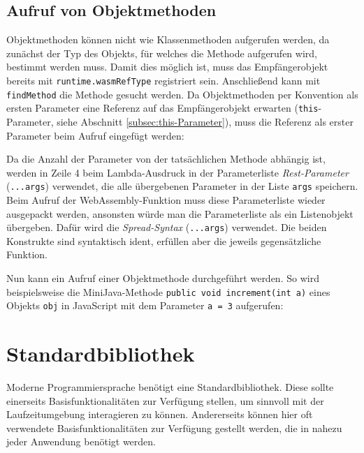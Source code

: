 \subsection{Aufruf von Objektmethoden}

Objektmethoden können nicht wie Klassenmethoden aufgerufen werden, da zunächst der Typ des Objekts, für welches die Methode aufgerufen wird, bestimmt werden muss. Damit dies möglich ist, muss das Empfängerobjekt bereits mit \lstinline{runtime.wasmRefType} registriert sein. Anschließend kann mit \lstinline{findMethod} die Methode gesucht werden. Da Objektmethoden per Konvention als ersten Parameter eine Referenz auf das Empfängerobjekt erwarten (\lstinline{this}-Parameter, siehe Abschnitt \ref{subsec:this-Parameter}), muss die Referenz als erster Parameter beim Aufruf eingefügt werden:



Da die Anzahl der Parameter von der tatsächlichen Methode abhängig ist, werden in Zeile 4 beim Lambda-Ausdruck in der Parameterliste \emph{Rest-Parameter} (\lstinline{...args}) \cite{MDNJavaScript} verwendet, die alle übergebenen Parameter in der Liste \lstinline{args} speichern. Beim Aufruf der WebAssembly-Funktion muss diese Parameterliste wieder ausgepackt werden, ansonsten würde man die Parameterliste als ein Listenobjekt übergeben. Dafür wird die \emph{Spread-Syntax} (\lstinline{...args}) verwendet. Die beiden Konstrukte sind syntaktisch ident, erfüllen aber die jeweils gegensätzliche Funktion.

Nun kann ein Aufruf einer Objektmethode durchgeführt werden. So wird beispielsweise die MiniJava-Methode \lstinline{public void increment(int a)} eines Objekts \lstinline{obj} in JavaScript mit dem Parameter \lstinline{a = 3} aufgerufen:



\section{Standardbibliothek}
\label{sec:Standardbibliothek}

Moderne Programmiersprache benötigt eine Standardbibliothek. Diese sollte einerseits Basisfunktionalitäten zur Verfügung stellen, um sinnvoll mit der Laufzeitumgebung interagieren zu können. Andererseits können hier oft verwendete Basisfunktionalitäten zur Verfügung gestellt werden, die in nahezu jeder Anwendung benötigt werden.

